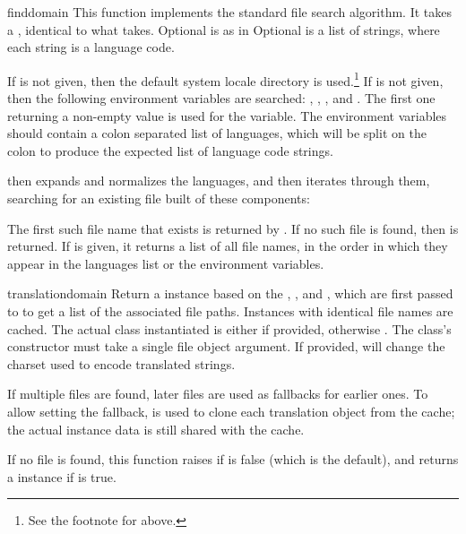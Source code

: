 \begin{funcdesc}{find}{domain}
This function implements the standard  file search
algorithm.  It takes a , identical to what
 takes.  Optional  is as in
  Optional  is a list of
strings, where each string is a language code.

If  is not given, then the default system locale
directory is used.\footnote{See the footnote for
 above.}  If  is not given,
then the following environment variables are searched: ,
, , and .  The first one
returning a non-empty value is used for the  variable.
The environment variables should contain a colon separated list of
languages, which will be split on the colon to produce the expected
list of language code strings.

 then expands and normalizes the languages, and then
iterates through them, searching for an existing file built of these
components:


The first such file name that exists is returned by .
If no such file is found, then  is returned. If 
is given, it returns a list of all file names, in the order in which
they appear in the languages list or the environment variables.
\end{funcdesc}

\begin{funcdesc}{translation}{domain}
Return a  instance based on the ,
, and , which are first passed to
 to get a list of the
associated  file paths.  Instances with
identical  file names are cached.  The actual class instantiated
is either  if provided, otherwise
.  The class's constructor must take a single
file object argument. If provided,  will change the
charset used to encode translated strings.

If multiple files are found, later files are used as fallbacks for
earlier ones. To allow setting the fallback, 
is used to clone each translation object from the cache; the actual
instance data is still shared with the cache.

If no  file is found, this function raises
 if  is false (which is the default),
and returns a  instance if  is
true.

\end{funcdesc}

